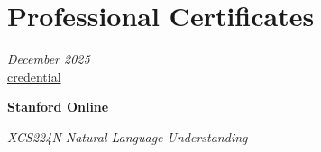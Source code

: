 \section{Professional Certificates}

    \begin{twocolentry}{
    
    \textit{December 2025}\\
\mbox{\href{https://example.com/certificates/xcs224n}{credential}}}
        \textbf{Stanford Online}
        
        \textit{XCS224N Natural Language Understanding}
    
    \end{twocolentry}
